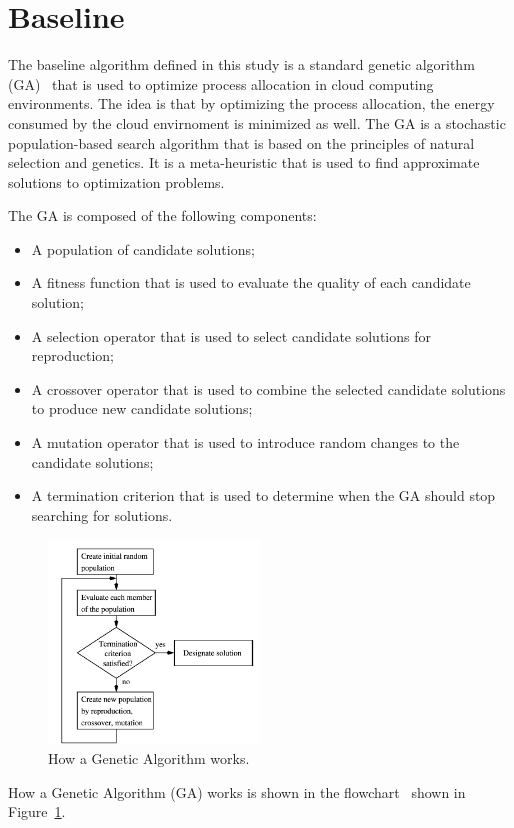 \section{Baseline}\label{sect:baseline} 

The baseline algorithm defined in this study is a standard genetic algorithm (GA)~\cite{mitchell1998introduction} that is used to optimize 
process allocation in cloud computing environments. The idea is that by optimizing the process allocation, the energy consumed by the cloud envirnoment is minimized as well.
The GA is a stochastic population-based search algorithm that is based on the principles of natural selection and genetics.
It is a meta-heuristic that is used to find approximate solutions to optimization problems.~\cite{kramer2017genetic}

The GA is composed of the following components:
\begin{itemize}
    \item A population of candidate solutions;
    \item A fitness function that is used to evaluate the quality of each candidate solution;
    \item A selection operator that is used to select candidate solutions for reproduction;
    \item A crossover operator that is used to combine the selected candidate solutions to produce new candidate solutions;
    \item A mutation operator that is used to introduce random changes to the candidate solutions;
    \item A termination criterion that is used to determine when the GA should stop searching for solutions.
\end{itemize}

\begin{figure}[h]
    \centering
    \includegraphics[width=0.5\textwidth]{./resources/examples/GAWorkflow.png}
    \caption{How a Genetic Algorithm works.}
    \label{fig:baseline}
\end{figure}
How a Genetic Algorithm (GA) works is shown in the flowchart~\cite{GAWorkflow} shown in Figure~\ref{fig:baseline}.

